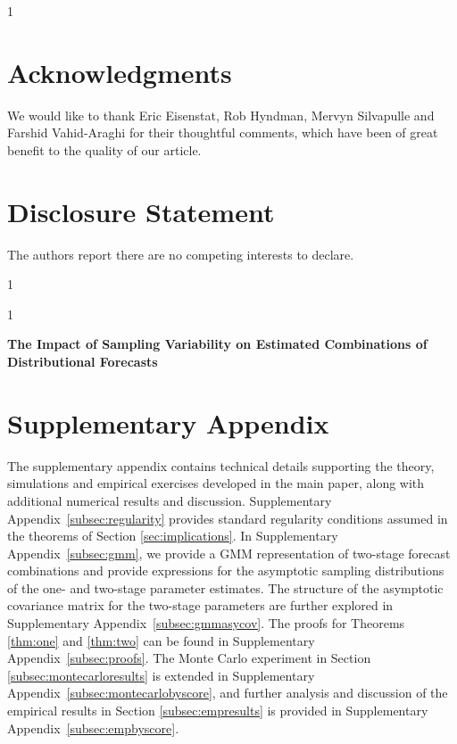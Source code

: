 \documentclass[12pt]{article}
\newcommand{\blind}{1}
\theoremstyle{definition}
\theoremstyle{remark}
\renewcommand{\appendixname}{Supplementary Appendix}
\begin{document}
\blind
{
\section*{Acknowledgments}
We would like to thank Eric Eisenstat, Rob Hyndman, Mervyn Silvapulle and Farshid Vahid-Araghi for their thoughtful comments, which have been of great benefit to the quality of our article.

\section*{Disclosure Statement}
The authors report there are no competing interests to declare.
}\fi

{
\footnotesize


}

\newpage


\blind
{
  \setcounter{footnote}{0}
  \renewcommand{\thefootnote}{\fnsymbol{footnote}}
  \title{\papertitle}
  \author{\paperauthors}
  \maketitle
  \footnotetext[1]{\funding}
  \footnotetext[2]{\mddisclaimer}
  \renewcommand{\thefootnote}{\arabic{footnote}}
} \fi

\blind
{
  \bigskip
  \bigskip
  \bigskip
  \begin{center}
    {\LARGE\bf The Impact of Sampling Variability on Estimated Combinations of Distributional Forecasts}
\end{center}
  \medskip
} \fi

\appendix

\section*{\centering \appendixname}
\setcounter{section}{1}

The supplementary appendix contains technical details supporting the theory, simulations and empirical exercises developed in the main paper, along with additional numerical results and discussion. \appendixname\ \ref{subsec:regularity} provides standard regularity conditions assumed in the theorems of Section \ref{sec:implications}. In \appendixname\ \ref{subsec:gmm}, we provide a GMM representation of two-stage forecast combinations and provide expressions for the asymptotic sampling distributions of the one- and two-stage parameter estimates. The structure of the asymptotic covariance matrix for the two-stage parameters are further explored in \appendixname\ \ref{subsec:gmmasycov}. The proofs for Theorems \ref{thm:one} and \ref{thm:two} can be found in \appendixname\ \ref{subsec:proofs}. The Monte Carlo experiment in Section \ref{subsec:montecarloresults} is extended in \appendixname\ \ref{subsec:montecarlobyscore}, and further analysis and discussion of the empirical results in Section \ref{subsec:empresults} is provided in \appendixname\ \ref{subsec:empbyscore}.
\end{document}
